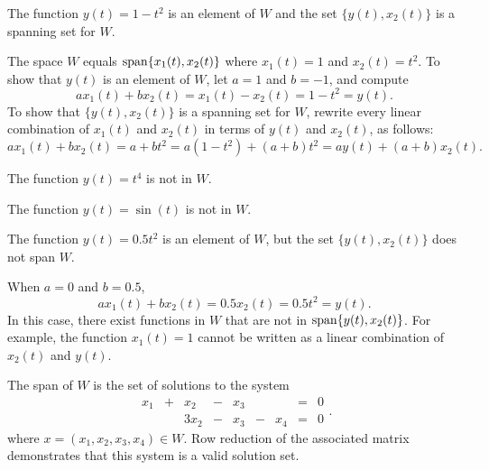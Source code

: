 \documentclass{ximera}
\begin{document}
\ans The function $y(t) = 1 - t^2$ is an element of $W$ and the set
$\{y(t),x_2(t)\}$ is a spanning set for $W$.



\soln The space $W$ equals ${\rm span}\{x_1(t),x_2(t)\}$ where $x_1(t)=1$ and 
$x_2(t)=t^2$.  To show that $y(t)$ is an element of $W$, let
$a = 1$ and $b = -1$, and compute
\[
ax_1(t) + bx_2(t) = x_1(t) - x_2(t) = 1 - t^2 = y(t). 
\]
To show that $\{y(t),x_2(t)\}$ is a spanning set for $W$, rewrite every
linear combination of $x_1(t)$ and $x_2(t)$ in terms of $y(t)$ and $x_2(t)$, 
as follows:
\[ 
ax_1(t) + bx_2(t) = a + bt^2 = a(1 - t^2) + (a + b)t^2
= ay(t) + (a + b)x_2(t). 
\]

 The function $y(t) = t^4$ is not in $W$.

 The function $y(t) = \sin(t)$ is not in $W$.

\ans The function $y(t) = 0.5t^2$ is an element of $W$, but the set
$\{y(t),x_2(t)\}$ does not span $W$.

\soln When $a = 0$ and $b = 0.5$,
\[ 
ax_1(t) + bx_2(t) = 0.5x_2(t) = 0.5t^2 = y(t). 
\]
In this case, there exist functions in $W$ that are not in 
${\rm span}\{y(t),x_2(t)\}$.  For example, the function $x_1(t) = 1$ cannot
be written as a linear combination of $x_2(t)$ and $y(t)$.

\ans The span of $W$ is the set of solutions to the system
\[ 
\begin{array}{rrrrrrrrr}
x_1 & + & x_2 & - & x_3 & & & = & 0 \\
& & 3x_2 & - & x_3 & - & x_4 & = & 0 \end{array}. 
\]
where $x = (x_1,x_2,x_3,x_4) \in W$.  Row reduction of the associated
matrix demonstrates that this system is a valid solution set.
\end{document}
